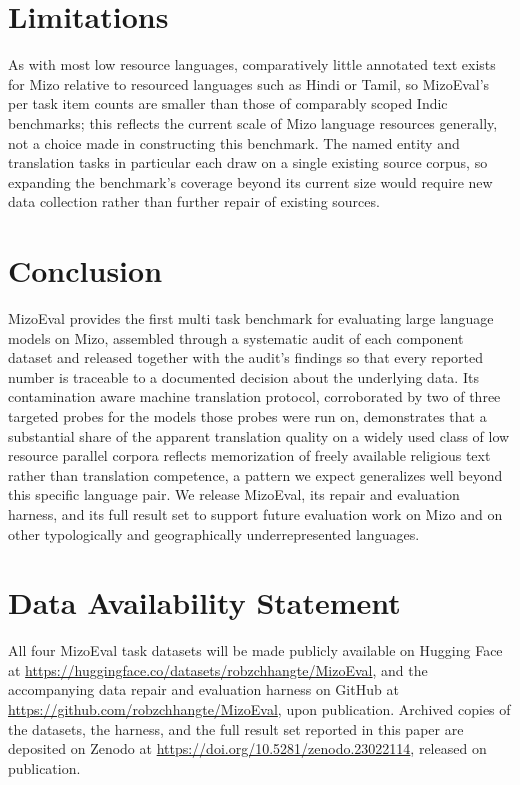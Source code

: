 \documentclass[11pt,a4paper]{article}
\begin{document}
\section{Limitations}
\label{sec:limitations}

As with most low resource languages, comparatively little annotated text exists for Mizo relative to resourced languages such as Hindi or Tamil, so MizoEval's per task item counts are smaller than those of comparably scoped Indic benchmarks; this reflects the current scale of Mizo language resources generally, not a choice made in constructing this benchmark. The named entity and translation tasks in particular each draw on a single existing source corpus, so expanding the benchmark's coverage beyond its current size would require new data collection rather than further repair of existing sources.

\section{Conclusion}
\label{sec:conclusion}

MizoEval provides the first multi task benchmark for evaluating large language models on Mizo, assembled through a systematic audit of each component dataset and released together with the audit's findings so that every reported number is traceable to a documented decision about the underlying data. Its contamination aware machine translation protocol, corroborated by two of three targeted probes for the models those probes were run on, demonstrates that a substantial share of the apparent translation quality on a widely used class of low resource parallel corpora reflects memorization of freely available religious text rather than translation competence, a pattern we expect generalizes well beyond this specific language pair. We release MizoEval, its repair and evaluation harness, and its full result set to support future evaluation work on Mizo and on other typologically and geographically underrepresented languages.

\section*{Data Availability Statement}

All four MizoEval task datasets will be made publicly available on Hugging Face at \url{https://huggingface.co/datasets/robzchhangte/MizoEval}, and the accompanying data repair and evaluation harness on GitHub at \url{https://github.com/robzchhangte/MizoEval}, upon publication. Archived copies of the datasets, the harness, and the full result set reported in this paper are deposited on Zenodo at \url{https://doi.org/10.5281/zenodo.23022114}, released on publication.
\end{document}
